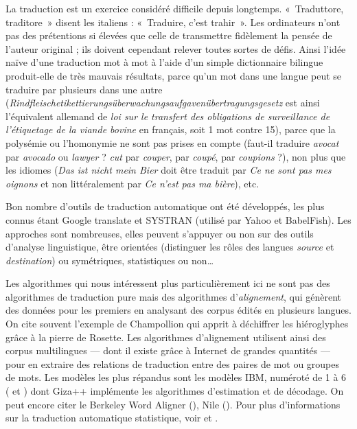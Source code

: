 \documentclass[a4paper,10pt]{article}
\newcommand{\guill}[1]{«~#1~»}
\begin{document}
La traduction est un exercice considéré difficile depuis longtemps. \guill{Traduttore, traditore} disent les italiens : \guill{Traduire, c'est trahir}. Les ordinateurs n'ont pas des prétentions si élevées que celle de transmettre fidèlement la pensée de l'auteur original ; ils doivent cependant relever toutes sortes de défis. Ainsi l'idée naïve d'une traduction mot à mot à l'aide d'un simple dictionnaire bilingue produit-elle de très mauvais résultats, parce qu'un mot dans une langue peut se traduire par plusieurs dans une autre (\emph{Rindfleischetikettierungsüberwachungsaufgavenübertragungsgesetz} est ainsi l'équivalent allemand de \emph{loi sur le transfert des obligations de surveillance de l'étiquetage de la viande bovine} en français, soit 1 mot contre 15), parce que la polysémie ou l'homonymie ne sont pas prises en compte (faut-il traduire \emph{avocat} par \emph{avocado} ou \emph{lawyer} ? \emph{cut} par \emph{couper}, par \emph{coupé}, par \emph{coupions} ?), non plus que les idiomes (\emph{Das ist nicht mein Bier} doit être traduit par \emph{Ce ne sont pas mes oignons} et non littéralement par \emph{Ce n'est pas ma bière}), etc.

Bon nombre d'outils de traduction automatique ont été développés, les plus connus étant Google translate et SYSTRAN (utilisé par Yahoo et BabelFish). Les approches sont nombreuses, elles peuvent s'appuyer ou non sur des outils d'analyse linguistique, être orientées (distinguer les rôles des langues \emph{source} et \emph{destination}) ou symétriques, statistiques ou non\dots

Les algorithmes qui nous intéressent plus particulièrement ici ne sont pas des algorithmes de traduction pure mais des algorithmes d'\emph{alignement}, qui génèrent des données pour les premiers en analysant des corpus édités en plusieurs langues. On cite souvent l'exemple de Champollion qui apprit à déchiffrer les hiéroglyphes grâce à la pierre de Rosette. Les algorithmes d'alignement utilisent ainsi des corpus multilingues --- dont il existe grâce à Internet de grandes quantités --- pour en extraire des relations de traduction entre des paires de mot ou groupes de mots. Les modèles les plus répandus sont les modèles IBM, numéroté de 1 à 6 (\cite{vogel1996hmm} et \cite{och2003systematic}) dont Giza++ \cite{och2003giza++} implémente les algorithmes d'estimation et de décodage. On peut encore citer le Berkeley Word Aligner (\cite{berkeleywordaligner}), Nile (\cite{nilewordaligner}). Pour plus d'informations sur la traduction automatique statistique, voir \cite{Brown:1990:SAM:92858.92860} et \cite{gaussier2011modeles}.
\end{document}
